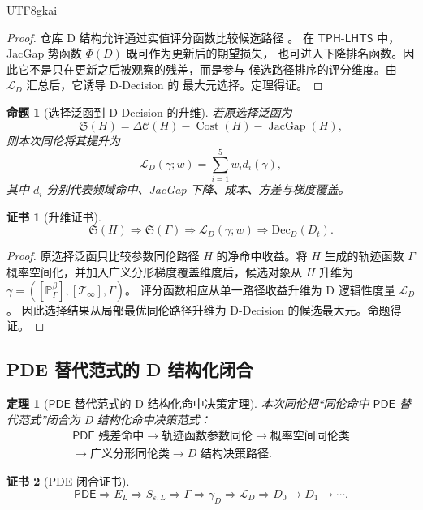 \documentclass[12pt]{article}
\newtheorem{theorem}{定理}[section]
\newtheorem{proposition}{命题}[section]
\newtheorem{Certificate}{证书}[section]
\newcommand{\TPHLHTS}{\ensuremath{\mathsf{TPH\mbox{-}LHTS}}}
\newcommand{\PDE}{\ensuremath{\mathsf{PDE}}}
\DeclareMathOperator{\Cost}{Cost}
\DeclareMathOperator{\JacGap}{JacGap}
\begin{document}
\begin{CJK*}{UTF8}{gkai}
\begin{proof}
仓库 D 结构允许通过实值评分函数比较候选路径 \cite{RepoTex3DStructure}。
在 \(\TPHLHTS\) 中，JacGap 势函数 \(\Phi(D)\) 既可作为更新后的期望损失，
也可进入下降排名函数。因此它不是只在更新之后被观察的残差，而是参与
候选路径排序的评分维度。由 \(\mathcal L_D\) 汇总后，它诱导 D-Decision 的
最大元选择。定理得证。
\end{proof}

\begin{proposition}[选择泛函到 D-Decision 的升维]
若原选择泛函为
\[
\mathfrak S(H)
=
\Delta\mathcal C(H)-\Cost(H)-\JacGap(H),
\]
则本次同伦将其提升为
\[
\boxed{
\mathcal L_D(\gamma;w)
=
\sum_{i=1}^{5}w_i d_i(\gamma),
}
\]
其中 \(d_i\) 分别代表频域命中、JacGap 下降、成本、方差与梯度覆盖。
\end{proposition}

\begin{Certificate}[升维证书]
\[
\boxed{
\mathfrak S(H)
\Rightarrow
\mathfrak S(\Gamma)
\Rightarrow
\mathcal L_D(\gamma;w)
\Rightarrow
\mathrm{Dec}_D(D_t).
}
\]
\end{Certificate}

\begin{proof}
原选择泛函只比较参数同伦路径 \(H\) 的净命中收益。将 \(H\) 生成的轨迹函数
\(\Gamma\) 概率空间化，并加入广义分形梯度覆盖维度后，候选对象从 \(H\)
升维为 \(\gamma=([\mathbb P_\Gamma^\beta],[\mathcal T_\infty],\Gamma)\)。
评分函数相应从单一路径收益升维为 D 逻辑性度量 \(\mathcal L_D\)。
因此选择结果从局部最优同伦路径升维为 D-Decision 的候选最大元。命题得证。
\end{proof}

\subsection{PDE 替代范式的 D 结构化闭合}
\label{subsec:pde-paradigm-d-closure}

\begin{theorem}[\(\PDE\) 替代范式的 D 结构化命中决策定理]
本次同伦把“同伦命中 \(\PDE\) 替代范式”闭合为 D 结构化命中决策范式：
\[
\boxed{
\begin{gathered}
\PDE\text{ 残差命中}
\to
\text{轨迹函数参数同伦}
\to
\text{概率空间同伦类}
\\
\to
\text{广义分形同伦类}
\to
D\text{ 结构决策路径}.
\end{gathered}
}
\]
\end{theorem}

\begin{Certificate}[PDE 闭合证书]
\[
\boxed{
\PDE
\Rightarrow
E_L
\Rightarrow
S_{\varepsilon,L}
\Rightarrow
\Gamma
\Rightarrow
\gamma_D
\Rightarrow
\mathcal L_D
\Rightarrow
D_0\to D_1\to\cdots.
}
\]
\end{Certificate}


\end{CJK*}
\end{document}
